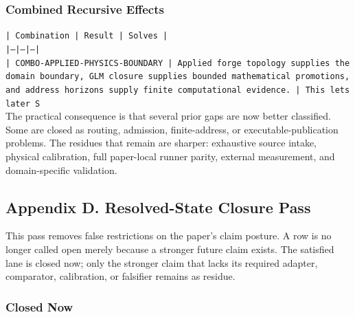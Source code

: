 \documentclass[11pt]{article}
\begin{document}
\subsubsection*{Combined Recursive Effects}

\noindent\texttt{| Combination | Result | Solves |}\\
\noindent\texttt{|---|---|---|}\\
\noindent\texttt{| COMBO-APPLIED-PHYSICS-BOUNDARY | Applied forge topology supplies the domain boundary, GLM closure supplies bounded mathematical promotions, and address horizons supply finite computational evidence. | This lets later S}\\

The practical consequence is that several prior gaps are now better classified. Some are closed as routing, admission, finite-address, or executable-publication problems. The residues that remain are sharper: exhaustive source intake, physical calibration, full paper-local runner parity, external measurement, and domain-specific validation.

\subsection*{Appendix D. Resolved-State Closure Pass}

This pass removes false restrictions on the paper's claim posture. A row is no longer called open merely because a stronger future claim exists. The satisfied lane is closed now; only the stronger claim that lacks its required adapter, comparator, calibration, or falsifier remains as residue.

\subsubsection*{Closed Now}
\end{document}
